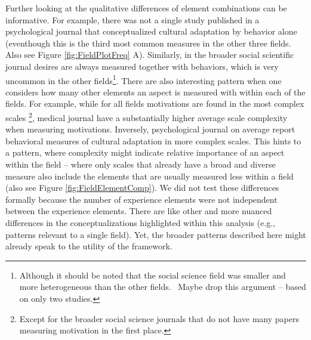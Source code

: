 Further looking at the qualitative differences of element combinations
can be informative. For example, there was not a single study published
in a psychological journal that conceptualized cultural adaptation by
behavior alone (eventhough this is the third most common measures in the
other three fields. Also see Figure \ref{fig:FieldPlotFreq} A).
Similarly, in the broader social scientific journal desires are always
measured together with behaviors, which is very uncommon in the other
fields\footnote{Although it should be noted that the social science field was smaller and more heterogeneous than the other fields. \Warning\ Maybe drop this argument -- based on only two studies.}.
There are also interesting pattern when one considers how many other
elements an aspect is measured with within each of the fields. For
example, while for all fields motivations are found in the most complex
scales
\footnote{Except for the broader social science journals that do not have many papers measuring motivation in the first place.},
medical journal have a substantially higher average scale complexity
when measuring motivations. Inversely, psychological journal on average
report behavioral measures of cultural adaptation in more complex
scales. This hints to a pattern, where complexity might indicate
relative importance of an aspect within the field -- where only scales
that already have a broad and diverse measure also include the elements
that are usually measured less within a field (also see Figure
\ref{fig:FieldElementComp}). We did not test these differences formally
because the number of experience elements were not independent between
the experience elements. There are like other and more nuanced
differences in the conceptualizations highlighted within this analysis
(e.g., patterns relevant to a single field). Yet, the broader patterns
described here might already speak to the utility of the framework.

